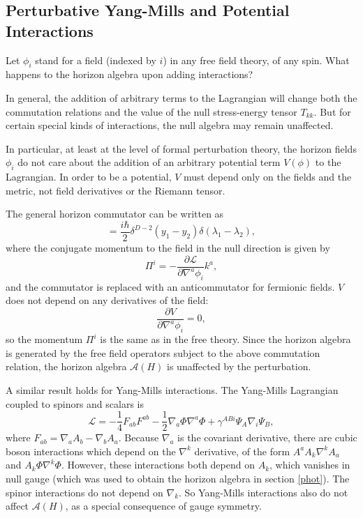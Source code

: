 \documentclass{article}
\begin{document}
\subsection{Perturbative Yang-Mills and Potential Interactions}

Let $\phi_i$ stand for a field (indexed by $i$) in any free field theory, of any spin.  What happens to the horizon algebra upon adding interactions?

In general, the addition of arbitrary terms to the Lagrangian will change both the commutation relations and the value of the null stress-energy tensor $T_{kk}$.  But for certain special kinds of interactions, the null algebra may remain unaffected.

In particular, at least at the level of formal perturbation theory, the horizon fields $\phi_i$ do not care about the addition of an arbitrary potential term $V(\phi)$ to the Lagrangian.  In order to be a potential, $V$ must depend only on the fields and the metric, not field derivatives or the Riemann tensor.

The general horizon commutator can be written as
\begin{equation}
[\phi_i ,\, \Pi^i] = \frac{i\hbar}{2} \delta^{D-2}(y_1 - y_2) \delta(\lambda_1 - \lambda_2),
\end{equation}
where the conjugate momentum to the field in the null direction is given by
\begin{equation}\label{conpi}
\Pi^i = -\frac{ \partial \mathcal{L} }{\partial \nabla^a \phi_i } k^a,
\end{equation}
and the commutator is replaced with an anticommutator for fermionic fields.  $V$ does not depend on any derivatives of the field:
\begin{equation}
\frac{ \partial V}{\partial \nabla^a \phi_i } = 0,
\end{equation}
so the momentum $\Pi^i$ is the same as in the free theory.  Since the horizon algebra is generated by the free field operators subject to the above commutation relation, the horizon algebra $\mathcal{A}(H)$ is unaffected by the perturbation.

A similar result holds for Yang-Mills interactions.  The Yang-Mills Lagrangian coupled to spinors and scalars is
\begin{equation}
\mathcal{L} = -\frac{1}{4} F_{ab} F^{ab} - \frac{1}{2} \nabla_a \Phi \nabla^a \Phi + \gamma^{ABi} \Psi_A \nabla_i \Psi_B,
\end{equation}
where $F_{ab} = \nabla_a A_b - \nabla_b A_a$.  Because $\nabla_a$ is the covariant derivative, there are cubic boson interactions which depend on the $\nabla^k$ derivative, of the form $A^a A_k \nabla^k A_a$ and $A_k \Phi \nabla^k \Phi$.  However, these interactions both depend on $A_k$, which vanishes in null gauge (which was used to obtain the horizon algebra in section \ref{phot}).  The spinor interactions do not depend on $\nabla_k$.  So Yang-Mills interactions also do not affect $\mathcal{A}(H)$, as a special consequence of gauge symmetry.
\end{document}
